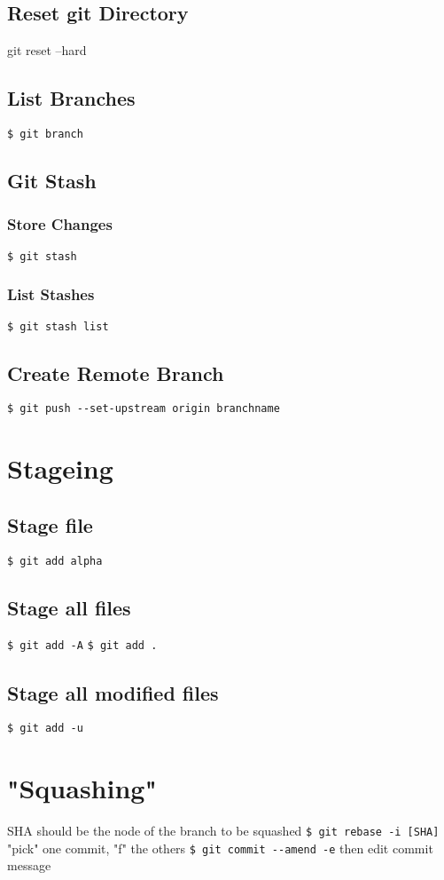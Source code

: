 \documentclass{article}
\begin{document}
\begin{multicols}{3}
\subsection{Reset git Directory}
git reset --hard

\subsection{List Branches}
\lstinline|$ git branch|

\subsection{Git Stash}
\subsubsection{Store Changes}
\lstinline|$ git stash|

\subsubsection{List Stashes}
\lstinline|$ git stash list|

\subsection{Create Remote Branch}
\lstinline|$ git push --set-upstream origin branchname|

\section{Stageing}
\subsection{Stage file}
\lstinline|$ git add alpha|

\subsection{Stage all files}
\lstinline|$ git add -A|
\lstinline|$ git add .|

\subsection{Stage all modified files}
\lstinline|$ git add -u|

\section{"Squashing"}
SHA should be the node of the branch to be squashed
\lstinline|$ git rebase -i [SHA]|
"pick" one commit, "f" the others
\lstinline|$ git commit --amend -e|
then edit commit message
\end{multicols}
\end{document}

